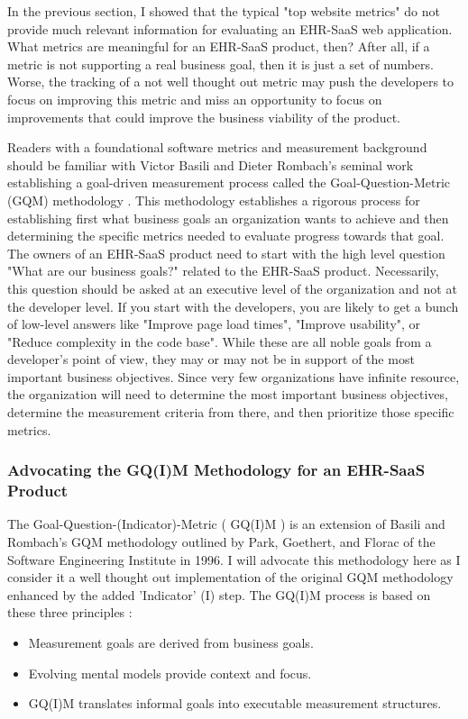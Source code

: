 \documentclass[10pt]{article}
\begin{document}
In the previous section, I showed that the typical "top website metrics" do not provide much relevant information for evaluating an EHR-SaaS web application.
What metrics are meaningful for an EHR-SaaS product, then?
After all, if a metric is not supporting a real business goal, then it is just a set of numbers.
Worse, the tracking of a not well thought out metric may push the developers to focus on improving this metric and miss an opportunity to focus on improvements that could improve the business viability of the product.

Readers with a foundational software metrics and measurement background should be familiar with Victor Basili and Dieter Rombach's seminal work establishing a goal-driven measurement process called the Goal-Question-Metric (GQM) methodology \cite{orig-gqm}.
This methodology establishes a rigorous process for establishing first what business goals an organization wants to achieve and then determining the specific metrics needed to evaluate progress towards that goal.
The owners of an EHR-SaaS product need to start with the high level question "What are our business goals?" related to the EHR-SaaS product.
Necessarily, this question should be asked at an executive level of the organization and not at the developer level.
If you start with the developers, you are likely to get a bunch of low-level answers like "Improve page load times", "Improve usability", or "Reduce complexity in the code base".
While these are all noble goals from a developer's point of view, they may or may not be in support of the most important business objectives.
Since very few organizations have infinite resource, the organization will need to determine the most important business objectives, determine the measurement criteria from there, and then prioritize those specific metrics.



\subsubsection{Advocating the GQ(I)M Methodology for an EHR-SaaS Product}
\label{sec:EHR-SaaS-GQM-Methodology}

The Goal-Question-(Indicator)-Metric ( GQ(I)M ) is an extension of Basili and Rombach's GQM methodology outlined by Park, Goethert, and Florac of the Software Engineering Institute in 1996.
I will advocate this methodology here as I consider it a well thought out implementation of the original GQM methodology enhanced by the added 'Indicator' (I) step.
The GQ(I)M process is based on these three principles \cite{sei-gqim}:
\begin{itemize}
	\item Measurement goals are derived from business goals.
	\item Evolving mental models provide context and focus.
	\item GQ(I)M translates informal goals into executable measurement structures.
\end{itemize}
\end{document}
